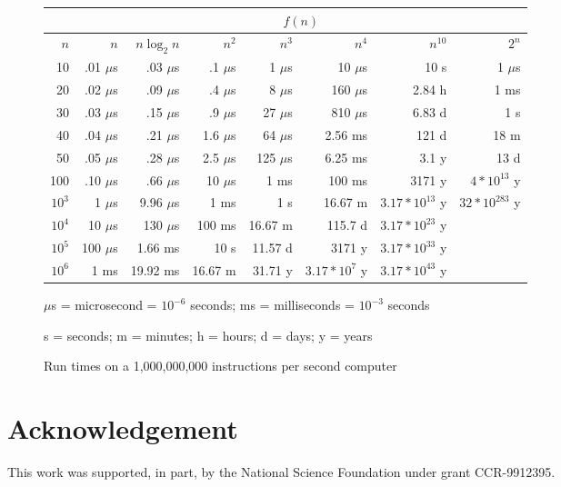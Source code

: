 \begin{figure}
\begin{center}
\begin{tabular} {|r || r | r| r| r| r| r| r|}
  & \multicolumn{7}{c|}{$f(n)$}\\ \hline
$n$ & $n$ & $n \log_2 n$ & $n^2$ & $n^3$ & $n^4$ & $n^{10}$ & $2^n$ \\ \hline
10 & .01 $\mu$s & .03 $\mu$s & .1 $\mu$s & 1 $\mu$s & 10 $\mu$s & 10 s & 1 $\mu$s \\
20 & .02 $\mu$s & .09 $\mu$s & .4 $\mu$s & 8 $\mu$s & 160 $\mu$s & 2.84 h & 1 ms \\
30 & .03 $\mu$s & .15 $\mu$s & .9 $\mu$s & 27 $\mu$s & 810 $\mu$s & 6.83 d & 1 s \\
40 & .04 $\mu$s & .21 $\mu$s & 1.6 $\mu$s & 64 $\mu$s & 2.56 ms & 121 d & 18 m \\
50 & .05 $\mu$s & .28 $\mu$s & 2.5 $\mu$s & 125 $\mu$s & 6.25 ms & 3.1 y & 13 d \\
100 & .10 $\mu$s & .66 $\mu$s & 10 $\mu$s & 1 ms & 100 ms & 3171 y & $4 * 10^{13}$ y \\
$10^3$ & 1 $\mu$s & 9.96 $\mu$s & 1 ms & 1 s & 16.67 m & $3.17 * 10^{13}$ y & $32 * 10^{283}$ y \\
$10^4$ & 10 $\mu$s & 130 $\mu$s & 100 ms & 16.67 m & 115.7 d & $3.17 * 10^{23}$ y &     \\
$10^5$ & 100 $\mu$s & 1.66 ms & 10 s & 11.57 d & 3171 y & $3.17 * 10^{33}$ y &     \\
$10^6$ & 1 ms & 19.92 ms & 16.67 m & 31.71 y & $3.17 * 10^7$ y & $3.17 * 10^{43}$ y &     \\ 
\end{tabular}
\end{center}
\centerline{
$\mu$s = microsecond = $10^{-6}$ seconds; ms = milliseconds = $10^{-3}$ seconds
}
\centerline{
s = seconds; m = minutes; h = hours; d = days; y = years
}
\caption{Run times on a 1,000,000,000 instructions per second computer
\label{fig2:10.17}}
\end{figure}


\section*{Acknowledgement}
This work was supported,
in part, by the National Science Foundation under
grant CCR-9912395.

